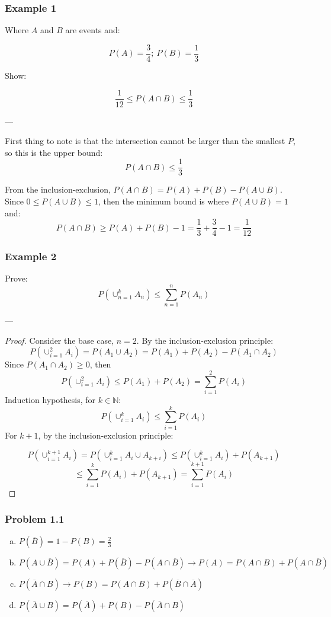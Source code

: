 \documentclass{article}
\begin{document}
\subsubsection*{Example 1}

Where $A$ and $B$ are events and:

$$P(A) = \frac{3}{4};\ P(B)=\frac{1}{3}$$

Show:

$$\frac{1}{12} \leq P(A \cap B) \leq \frac{1}{3}$$


---

First thing to note is that the intersection cannot be larger than the smallest $P$, so this is the upper bound: $$P(A \cap B) \leq \frac{1}{3}$$

From the inclusion-exclusion, $P(A \cap B) = P(A) + P(B) - P(A \cup B)$. Since $0 \leq P(A \cup B) \leq 1$, then the minimum bound is where $P(A \cup B) = 1$ and: $$P(A \cap B) \geq P(A) + P(B) - 1 = \frac{1}{3} + \frac{3}{4} - 1 = \frac{1}{12}$$


\subsubsection*{Example 2}

Prove: $$P(\cup_{n=1}^k A_n) \leq \sum_{n=1}^{n} P(A_n)$$

---

\begin{proof}[Proof]

Consider the base case, $n=2$. By the inclusion-exclusion principle:
$$P(\cup_{i=1}^2 A_i) = P(A_1 \cup A_2) = P(A_1) + P(A_2) - P(A_1 \cap A_2)$$
Since $P(A_1 \cap A_2) \geq 0$, then  $$P(\cup_{i=1}^2 A_i) \leq P(A_1) + P(A_2) 
 = \sum_{i=1}^{2} P(A_i)$$
Induction hypothesis, for $k \in \mathbb{N}$: $$P(\cup_{i=1}^k A_i) \leq \sum_{i=1}^{k} P(A_i)$$
For $k+1$, by the inclusion-exclusion principle:


$$P ( \cup_{i=1}^{k+1} A_i ) = P(\cup^k_{i=1} A_i \cup A_{k+i}) \leq P(\cup_{i=1}^k A_i) + P(A_{k+1})$$ $$ \leq \sum_{i=1}^k P(A_i) + P(A_{k+1}) = \sum_{i=1}^{k+1} P(A_i) $$
  
\end{proof}

\subsubsection*{Problem 1.1}

\begin{enumerate}[(a)]

\item $P(\overline{B}) = 1 - P(B) = \frac{2}{3}$

\item $P(A \cup \overline{B}) = P(A) + P(\overline{B}) - P(A \cap \overline{B}) \rightarrow P(A) = P(A \cap B) + P(A \cap \overline{B})$

\item $P(\overline{A} \cap B) \rightarrow P(B) = P(A \cap B) + P(\overline{B} \cap \overline{A})$

\item $P(\overline{A} \cup B) = P(\overline{A}) + P(B) - P(\overline{A} \cap B)$

\end{enumerate}
\end{document}
